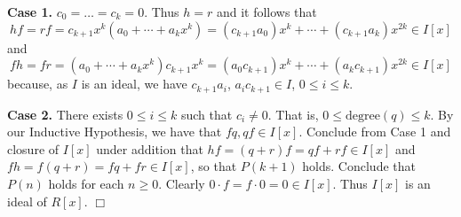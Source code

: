 \documentclass[9pt]{article}
\newcommand{\qed}{\hfill \ensuremath{\Box}}
\begin{document}
\begin{enumerate}
      \textbf{Case 1.} $c_0 = \ldots = c_k = 0$. Thus $h = r$ and it follows
      that
      $$hf = rf = c_{k+1}x^k(a_0 + \cdots + a_kx^k) = (c_{k+1}a_0)x^k + \cdots +
         (c_{k+1}a_k)x^{2k} \in I[x]$$
      and
      $$fh = fr = (a_0 + \cdots + a_kx^k)c_{k+1}x^k = (a_0c_{k+1})x^k + \cdots +
         (a_kc_{k+1})x^{2k} \in I[x]$$
      because, as $I$ is an ideal, we have
      $c_{k+1}a_i$, $a_ic_{k+1} \in I$, $0 \le i \le k$.

      \textbf{Case 2.} There exists $0 \le i \le k$ such that $c_i \neq 0$. That 
      is, $0 \le \text{degree}(q) \le k$. By our Inductive Hypothesis, we have
      that $fq, qf \in I[x]$. Conclude from Case 1 and closure of $I[x]$ under
      addition that $hf = (q + r)f = qf +  rf \in I[x]$ and
      $fh = f(q + r) = fq + fr \in I[x]$, so that $P(k + 1)$ holds. Conclude
      that $P(n)$ holds for each $n \ge 0$. Clearly
      $0 \cdot f = f \cdot 0 = 0 \in I[x]$. Thus $I[x]$ is an ideal of $R[x]$.
      \qed
\end{enumerate}
\end{document}
